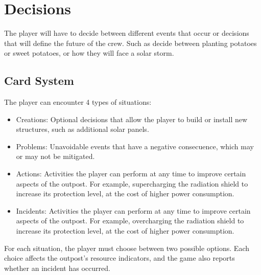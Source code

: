 \section{Decisions}

\indent

The player will have to decide between different events that occur or decisions that will define the future of the crew. Such as decide between planting potatoes or sweet potatoes, or how they will face a solar storm. 



\subsection{Card System}

 The player can encounter 4 types of situations: 

 \begin{itemize}
    
    \item Creations: Optional decisions that allow the player to build or install new structures, such as additional solar panels.
    \item Problems: Unavoidable events that have a negative consecuence, which may or may not be mitigated.
    \item Actions: Activities the player can perform at any time to improve certain aspects of the outpost. For example, supercharging the radiation shield to increase its protection level, at the cost of higher power consumption.
    \item Incidents: Activities the player can perform at any time to improve certain aspects of the outpost. For example, overcharging the radiation shield to increase its protection level, at the cost of higher power consumption.

 \end{itemize}
 
For each situation, the player must choose between two possible options. Each choice affects the outpost's resource indicators, and the game also reports whether an incident has occurred.



